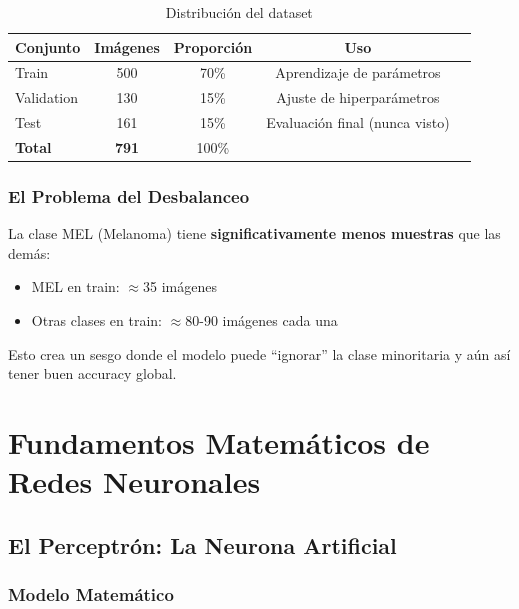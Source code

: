 \documentclass[12pt,a4paper]{article}
\begin{document}
\begin{table}[H]
\centering
\caption{Distribución del dataset}
\label{tab:split}
\begin{tabular}{@{}lcccp{5cm}@{}}
\toprule
\textbf{Conjunto} & \textbf{Imágenes} & \textbf{Proporción} & \textbf{Uso} \\
\midrule
Train & 500 & 70\% & Aprendizaje de parámetros \\
Validation & 130 & 15\% & Ajuste de hiperparámetros \\
Test & 161 & 15\% & Evaluación final (nunca visto) \\
\midrule
\textbf{Total} & \textbf{791} & 100\% & \\
\bottomrule
\end{tabular}
\end{table}

\subsubsection{El Problema del Desbalanceo}

\begin{warningbox}
La clase MEL (Melanoma) tiene \textbf{significativamente menos muestras} que las demás:
\begin{itemize}
    \item MEL en train: $\approx$35 imágenes
    \item Otras clases en train: $\approx$80-90 imágenes cada una
\end{itemize}
Esto crea un sesgo donde el modelo puede ``ignorar'' la clase minoritaria y aún así tener buen accuracy global.
\end{warningbox}

\section{Fundamentos Matemáticos de Redes Neuronales}

\subsection{El Perceptrón: La Neurona Artificial}

\subsubsection{Modelo Matemático}
\end{document}
